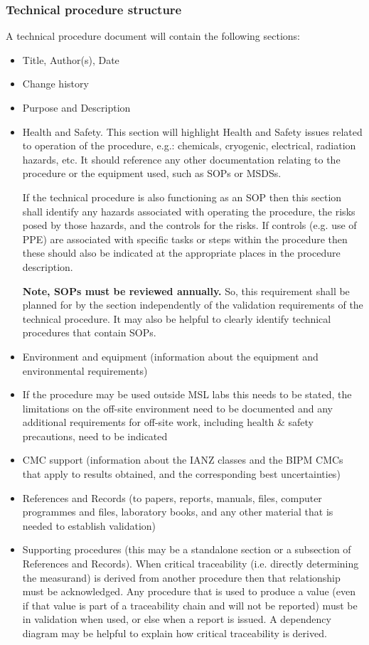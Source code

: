 \subsubsection{Technical procedure structure}
\label{sss:technical_procedure_structure}
A technical procedure document will contain the following sections:
\begin{itemize}
	\item Title, Author(s), Date
	\item Change history 
	\item Purpose and Description
	\item Health and Safety. This section will highlight Health and Safety issues related to operation of the procedure, e.g.: chemicals, cryogenic, electrical, radiation hazards, etc. It should reference any other documentation relating to the procedure or the equipment used, such as SOPs or MSDSs. 
	
	If the technical procedure is also functioning as an SOP then this section shall identify any hazards associated with operating the procedure, the risks posed by those hazards, and the controls for the risks. If controls (e.g. use of PPE) are associated with specific tasks or steps within the procedure then these should also be indicated at the appropriate places in the procedure description. 
	
	\textbf{Note, SOPs must be reviewed annually.} So, this requirement shall be planned for by the section independently of the validation requirements of the technical procedure. It may also be helpful to clearly identify technical procedures that contain SOPs. 
	
	\item Environment and equipment (information about the equipment and environmental requirements)
	\item If the procedure may be used outside MSL labs this needs to be stated, the limitations on the off-site environment need to be documented and any additional requirements for off-site work, including health \& safety precautions, need to be indicated
	\item CMC support (information about the IANZ classes and the BIPM CMCs that apply to results obtained, and the corresponding best uncertainties)
	\item References and Records (to papers, reports, manuals, files, computer programmes and files, laboratory books, and any other material that is needed to establish validation)
	\item Supporting procedures (this may be a standalone section or a subsection of References and Records). When critical traceability (i.e. directly determining the measurand) is derived from another procedure then that relationship must be acknowledged. Any procedure that is used to produce a value (even if that value is part of a traceability chain and will not be reported) must be in validation when used, or else when a report is issued. A dependency diagram may be helpful to explain how critical traceability is derived.
	
\end{itemize}

